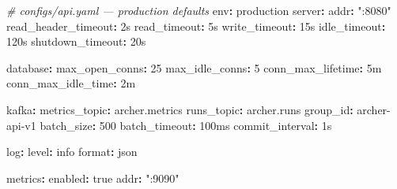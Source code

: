 \documentclass[
]{article}
\newenvironment{Shaded}{}{}
\newcommand{\AttributeTok}[1]{\textcolor[rgb]{0.49,0.56,0.16}{#1}}
\newcommand{\CharTok}[1]{\textcolor[rgb]{0.25,0.44,0.63}{#1}}
\newcommand{\CommentTok}[1]{\textcolor[rgb]{0.38,0.63,0.69}{\textit{#1}}}
\newcommand{\DecValTok}[1]{\textcolor[rgb]{0.25,0.63,0.44}{#1}}
\newcommand{\FunctionTok}[1]{\textcolor[rgb]{0.02,0.16,0.49}{#1}}
\newcommand{\KeywordTok}[1]{\textcolor[rgb]{0.00,0.44,0.13}{\textbf{#1}}}
\newcommand{\StringTok}[1]{\textcolor[rgb]{0.25,0.44,0.63}{#1}}
\begin{document}
\begin{Shaded}
\begin{Highlighting}[]
\CommentTok{\# configs/api.yaml — production defaults}
\FunctionTok{env}\KeywordTok{:}\AttributeTok{ production}
\FunctionTok{server}\KeywordTok{:}
\AttributeTok{  }\FunctionTok{addr}\KeywordTok{:}\AttributeTok{ }\StringTok{":8080"}
\AttributeTok{  }\FunctionTok{read\_header\_timeout}\KeywordTok{:}\AttributeTok{ 2s}
\AttributeTok{  }\FunctionTok{read\_timeout}\KeywordTok{:}\AttributeTok{ 5s}
\AttributeTok{  }\FunctionTok{write\_timeout}\KeywordTok{:}\AttributeTok{ 15s}
\AttributeTok{  }\FunctionTok{idle\_timeout}\KeywordTok{:}\AttributeTok{ 120s}
\AttributeTok{  }\FunctionTok{shutdown\_timeout}\KeywordTok{:}\AttributeTok{ 20s}

\FunctionTok{database}\KeywordTok{:}
\AttributeTok{  }\FunctionTok{max\_open\_conns}\KeywordTok{:}\AttributeTok{ }\DecValTok{25}
\AttributeTok{  }\FunctionTok{max\_idle\_conns}\KeywordTok{:}\AttributeTok{ }\DecValTok{5}
\AttributeTok{  }\FunctionTok{conn\_max\_lifetime}\KeywordTok{:}\AttributeTok{ 5m}
\AttributeTok{  }\FunctionTok{conn\_max\_idle\_time}\KeywordTok{:}\AttributeTok{ 2m}

\FunctionTok{kafka}\KeywordTok{:}
\AttributeTok{  }\FunctionTok{metrics\_topic}\KeywordTok{:}\AttributeTok{ archer.metrics}
\AttributeTok{  }\FunctionTok{runs\_topic}\KeywordTok{:}\AttributeTok{ archer.runs}
\AttributeTok{  }\FunctionTok{group\_id}\KeywordTok{:}\AttributeTok{ archer{-}api{-}v1}
\AttributeTok{  }\FunctionTok{batch\_size}\KeywordTok{:}\AttributeTok{ }\DecValTok{500}
\AttributeTok{  }\FunctionTok{batch\_timeout}\KeywordTok{:}\AttributeTok{ 100ms}
\AttributeTok{  }\FunctionTok{commit\_interval}\KeywordTok{:}\AttributeTok{ 1s}

\FunctionTok{log}\KeywordTok{:}
\AttributeTok{  }\FunctionTok{level}\KeywordTok{:}\AttributeTok{ info}
\AttributeTok{  }\FunctionTok{format}\KeywordTok{:}\AttributeTok{ json}

\FunctionTok{metrics}\KeywordTok{:}
\AttributeTok{  }\FunctionTok{enabled}\KeywordTok{:}\AttributeTok{ }\CharTok{true}
\AttributeTok{  }\FunctionTok{addr}\KeywordTok{:}\AttributeTok{ }\StringTok{":9090"}
\end{Highlighting}
\end{Shaded}
\end{document}
